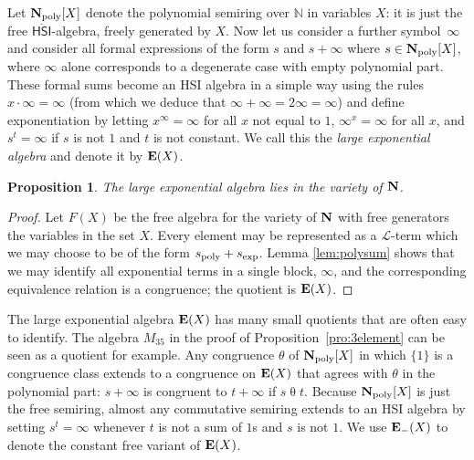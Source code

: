 \documentclass[eqnor,reqno]{amsart}
\theoremstyle{plain}
\newtheorem{pro}[thm]{Proposition}
\theoremstyle{definition}
\newcommand{\HSI}{\textsf{HSI}}
\begin{document}
Let ${\bf N}_{\rm poly}[X]$ denote the polynomial semiring over $\mathbb{N}$ in variables $X$: it is just the free $\overline{\HSI}$-algebra, freely generated by $X$.
Now let us consider a further symbol~$\infty$ and consider all formal expressions of the form $s$ and $s+\infty$ where $s\in {\bf N}_{\rm poly}[X]$, where $\infty$ alone corresponds to a degenerate case with empty polynomial part. 
These formal sums become an HSI algebra in a simple way using the rules $x\cdot \infty=\infty$ (from which we deduce that $\infty+\infty=2\infty=\infty$) and define exponentiation by letting $x^\infty=\infty$ for all $x$ not equal to $1$, $\infty^x=\infty$ for all $x$, and $s^t=\infty$ if $s$ is not $1$ and $t$ is not constant.
We call this the \emph{large exponential algebra} and denote it by ${\bf E}(X)$.
\begin{pro}
The large exponential algebra lies in the variety of ${\bf N}$.
\end{pro}
\begin{proof}
Let $F(X)$ be the free algebra for the variety of ${\bf N}$ with free generators the variables in the set $X$.
Every element may be represented as a $\mathscr{L}$-term which we may choose to be of the form $s_{\rm poly}+s_{\rm exp}$.
Lemma \ref{lem:polysum} shows that we may identify all exponential terms in a single block, $\infty$, and the corresponding equivalence relation is a congruence; the quotient is ${\bf E}(X)$.
\end{proof}

The large exponential algebra ${\bf E}(X)$ has many small quotients that are often easy to identify. The algebra $M_{35}$ in the proof of Proposition~\ref{pro:3element} can be seen as a quotient for example.
Any congruence $\theta$ of ${\bf N}_{\rm poly}[X]$ in which $\{1\}$ is a congruence class extends to a congruence on ${\bf E}(X)$ that agrees with $\theta$ in the polynomial part: $s+\infty$ is congruent to $t+\infty$ if $s\mathrel{\theta}t$.  
Because ${\bf N}_{\rm poly}[X]$ is just the free semiring, almost any commutative semiring extends to an HSI algebra by setting $s^t=\infty$ whenever $t$ is not a sum of $1$s and $s$ is not $1$.
We use ${\bf E}_-(X)$ to denote the constant free variant of ${\bf E}(X)$.


\end{document}

